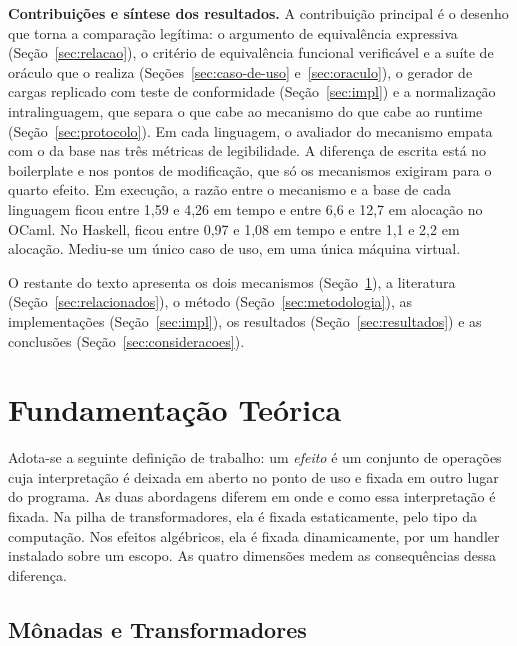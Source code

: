 \documentclass[12pt]{article}
\newcommand{\FaixaRAHaskell}{1,1 e 2,2}
\newcommand{\FaixaRAOcaml}{6,6 e 12,7}
\newcommand{\FaixaRTHaskell}{0,97 e 1,08}
\newcommand{\FaixaRTOcaml}{1,59 e 4,26}
\newcommand{\UmaMaquina}{uma única máquina virtual}
\begin{document}
\medskip
\noindent\textbf{Contribuições e síntese dos resultados.} A contribuição
principal é o desenho que torna a comparação legítima: o argumento de equivalência expressiva
(Seção~\ref{sec:relacao}), o critério de equivalência funcional verificável e
a suíte de oráculo que o realiza (Seções~\ref{sec:caso-de-uso}
e~\ref{sec:oraculo}), o gerador de cargas replicado com teste de
conformidade (Seção~\ref{sec:impl}) e a normalização intralinguagem, que separa o que cabe
ao mecanismo do que cabe ao runtime (Seção~\ref{sec:protocolo}).
Em cada linguagem, o avaliador do mecanismo empata com o da base nas três
métricas de legibilidade. A diferença de escrita está no boilerplate
e nos pontos de modificação, que só os mecanismos exigiram para o quarto
efeito. Em execução, a razão entre o mecanismo e a base de cada linguagem
ficou entre \FaixaRTOcaml{} em tempo e entre \FaixaRAOcaml{} em alocação no
OCaml. No Haskell, ficou entre \FaixaRTHaskell{} em tempo e entre \FaixaRAHaskell{}
em alocação. Mediu-se um único caso de uso, em \UmaMaquina{}.

O restante do texto apresenta os dois mecanismos
(Seção~\ref{sec:fundamentacao}), a literatura (Seção~\ref{sec:relacionados}),
o método (Seção~\ref{sec:metodologia}), as implementações
(Seção~\ref{sec:impl}), os resultados (Seção~\ref{sec:resultados}) e as
conclusões (Seção~\ref{sec:consideracoes}).

\section{Fundamentação Teórica}\label{sec:fundamentacao}

Adota-se a seguinte definição de trabalho: um \textit{efeito} é um conjunto de
operações cuja interpretação é deixada em aberto no ponto de uso e fixada em
outro lugar do programa. As duas abordagens diferem em onde e como essa
interpretação é fixada. Na pilha de transformadores, ela é fixada
estaticamente, pelo tipo da computação. Nos efeitos algébricos, ela é fixada
dinamicamente, por um handler instalado sobre um escopo. As quatro
dimensões medem as consequências dessa diferença.

\subsection{Mônadas e Transformadores}\label{sec:fund-monadas}
\end{document}
